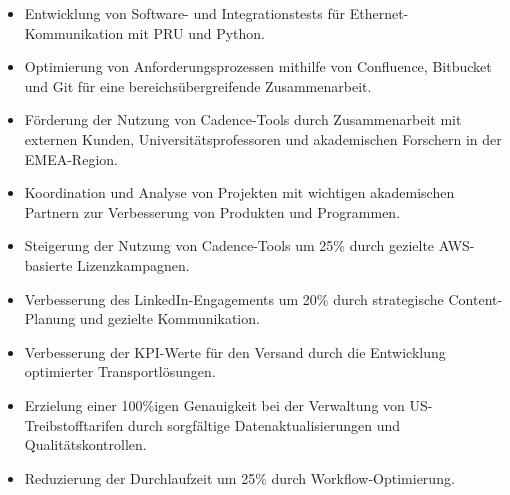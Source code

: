 \documentclass[10pt,a4paper,sans]{moderncv}        %
\begin{document}
 {}
 {
	\begin{itemize}
		\item Entwicklung von Software- und Integrationstests für Ethernet-Kommunikation mit PRU und Python.
		\item Optimierung von Anforderungsprozessen mithilfe von Confluence, Bitbucket und Git für eine bereichsübergreifende Zusammenarbeit.
	\end{itemize}
}		
		
 {}	
 {
	\begin{itemize}		
		\item Förderung der Nutzung von Cadence-Tools durch Zusammenarbeit mit externen Kunden, Universitätsprofessoren und akademischen Forschern in der EMEA-Region.
		\item Koordination und Analyse von Projekten mit wichtigen akademischen Partnern zur Verbesserung von Produkten und Programmen.
		\item Steigerung der Nutzung von Cadence-Tools um 25\% durch gezielte AWS-basierte Lizenzkampagnen.
		\item Verbesserung des LinkedIn-Engagements um 20\% durch strategische Content-Planung und gezielte Kommunikation.		
	\end{itemize}
}

{}
 {
	\begin{itemize}		
		\item Verbesserung der KPI-Werte für den Versand durch die Entwicklung optimierter Transportlösungen.
		\item Erzielung einer 100\%igen Genauigkeit bei der Verwaltung von US-Treibstofftarifen durch sorgfältige Datenaktualisierungen und Qualitätskontrollen.
		\item Reduzierung der Durchlaufzeit um 25\% durch Workflow-Optimierung.	
	\end{itemize}
}%
\end{document}
